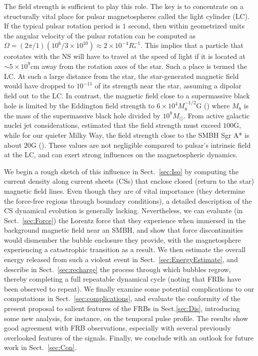 \documentclass{aa}
\begin{document}
The field strength is sufficient to play this role. The key is to concentrate on a structurally vital place for pulsar magnetospheres called the light cylinder (LC). If the typical pulsar rotation period is $1$ second,
then within geometrized units the angular velocity of the pulsar rotation can be computed as $\Omega=(2\pi/1)(10^6/3\times10^{10})\approx 2\times 10^{-4} R^{-1}_*$. This implies that a particle that corotates with the NS will have to travel at the speed of light if it is located at $\sim 5\times 10^{9}$cm away from the rotation axes of the star. Such a place is termed the LC. 
At such a large distance from the star, the star-generated magnetic field would have dropped to $10^{-11}$ of its strength near the star, assuming a dipolar field out to the LC. 
In contrast, the magnetic field close to a supermassive black hole is limited by the Eddington field strength to $6\times 10^4 M_8^{-1/2}$G (\cite{2008arXiv0810.1055D,2010Sci...329..927P}) where $M_8$ is the mass of the supermassive black hole divided by $10^8 M_{\odot}$.
From active galactic nuclei jet considerations, \cite{1977MNRAS.179..433B} estimated that the field strength must exceed $100$G, while for our quieter Milky Way, the field strength close to the SMBH Sgr A* is about $20$G (\cite{2013pss5.book..243M}). These values are not negligible compared to pulsar's intrinsic field at the LC, and can exert strong influences on the magnetospheric dynamics.  

We begin a rough sketch of this influence in Sect.~\ref{sec:Iso} by computing the current density along current sheets (CSs) that enclose closed (return to the star) magnetic field lines. Even though they are of vital importance (they determine the force-free regions through boundary conditions), a detailed description of the CS dynamical evolution is generally lacking. Nevertheless, we can evaluate (in Sect.~\ref{sec:Force}) the Lorentz force
that they experience when immersed in the background magnetic field near an SMBH, and show that force discontinuities would dismember the bubble enclosure they provide, with the magnetosphere experiencing a catastrophic transition as a result. We then estimate the overall energy released from such a violent event in Sect.~\ref{sec:EnergyEstimate}, and describe in Sect.~\ref{sec:recharge} the process through which bubbles regrow, thereby completing a full repeatable dynamical cycle (noting that FRBs have been observed to repeat). We finally examine some potential complications to our computations in Sect.~\ref{sec:complications}, and evaluate the conformity of the present proposal to salient features of the FRBs in Sect.\ref{sec:Dis}, introducing some new analysis, for instance, on the temporal pulse profile. The results show good agreement with FRB observations, especially with several previously overlooked features of the signals. Finally, we conclude with an outlook for future work in Sect.~\ref{sec:Con}.  
\end{document}
